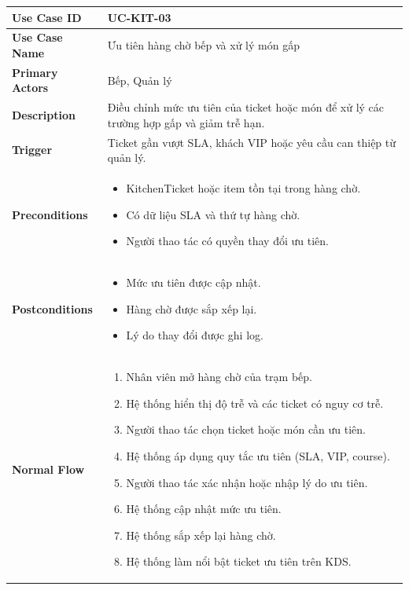\begin{longtable}{|p{4cm}|p{10cm}|}
\hline
\textbf{Use Case ID} & UC-KIT-03 \\ \hline
\textbf{Use Case Name} & Ưu tiên hàng chờ bếp và xử lý món gấp \\ \hline
\textbf{Primary Actors} & Bếp, Quản lý \\ \hline

\textbf{Description} & Điều chỉnh mức ưu tiên của ticket hoặc món để xử lý các trường hợp gấp và giảm trễ hạn. \\ \hline

\textbf{Trigger} & Ticket gần vượt SLA, khách VIP hoặc yêu cầu can thiệp từ quản lý. \\ \hline

\textbf{Preconditions} &
\begin{itemize}[leftmargin=*, noitemsep]
  \item \textsf{KitchenTicket} hoặc item tồn tại trong hàng chờ.
  \item Có dữ liệu SLA và thứ tự hàng chờ.
  \item Người thao tác có quyền thay đổi ưu tiên.
\end{itemize} \\ \hline

\textbf{Postconditions} &
\begin{itemize}[leftmargin=*, noitemsep]
  \item Mức ưu tiên được cập nhật.
  \item Hàng chờ được sắp xếp lại.
  \item Lý do thay đổi được ghi log.
\end{itemize} \\ \hline

\textbf{Normal Flow} &
\begin{enumerate}[leftmargin=*, noitemsep]
  \item Nhân viên mở hàng chờ của trạm bếp.
  \item Hệ thống hiển thị độ trễ và các ticket có nguy cơ trễ.
  \item Người thao tác chọn ticket hoặc món cần ưu tiên.
  \item Hệ thống áp dụng quy tắc ưu tiên (SLA, VIP, course).
  \item Người thao tác xác nhận hoặc nhập lý do ưu tiên.
  \item Hệ thống cập nhật mức ưu tiên.
  \item Hệ thống sắp xếp lại hàng chờ.
  \item Hệ thống làm nổi bật ticket ưu tiên trên KDS.
\end{enumerate} \\ \hline


\end{longtable}
